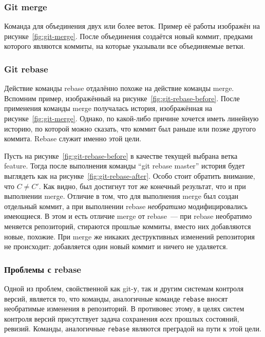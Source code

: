 \subsubsection{Git merge}

Команда для объединения двух или более веток. Пример её работы
изображён на рисунке~\ref{fig:git-merge}. После объединения создаётся
новый коммит, предками которого являются коммиты, на которые указывали
все объединяемые ветки.

\subsubsection{Git rebase}

Действие команды rebase отдалённо похоже на действие команды merge.
Вспомним пример, изображённый на рисунке~\ref{fig:git-rebase-before}.
После применения команды merge получалась история, изображённая на
рисунке~\ref{fig:git-merge}. Однако, по какой-либо причине хочется
иметь линейную историю, по которой можно сказать, что коммит был
раньше или позже другого коммита. Rebase служит именно этой цели. 

Пусть на рисунке~\ref{fig:git-rebase-before} в качестве текущей
выбрана ветка feature. Тогда после выполнения команды ``git rebase
master'' история будет выглядеть как на
рисунке~\ref{fig:git-rebase-after}. Особо стоит обратить внимание, что
$C \ne C'$. Как видно, был достигнут тот же конечный результат, что и
при выполнении merge. Отличие в том, что для выполнения merge был
создан отдельный коммит, а при выполнении rebase \emph{необратимо}
модифицировались имеющиеся. В этом и есть отличие merge от rebase~---
при rebase необратимо меняется репозиторий, стираются прошлые коммиты,
вместо них добавляются новые, похожие. При merge же никаких
деструктивных изменений репозитория не происходит: добавляется один
новый коммит и ничего не удаляется.

\subsubsection{Проблемы с rebase}

Одной из проблем, свойственной как git-у, так и другим системам
контроля версий, является то, что команды, аналогичные команде
\texttt{rebase} вносят необратимые изменения в репозиторий. В
противовес этому, в целях систем контроля версий присутствует задача
сохранения \emph{всех} прошлых состояний, ревизий. Команды,
аналогичные \texttt{rebase} являются преградой на пути к этой цели. 

